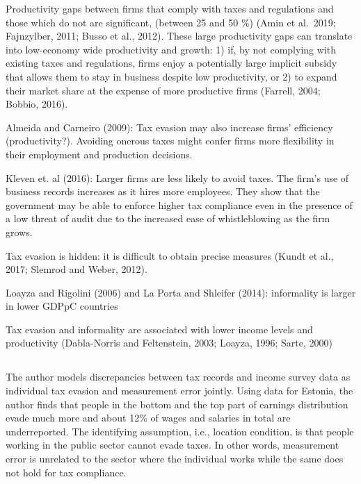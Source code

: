 \documentclass[
  12pt]{article}
\theoremstyle{definition}
\theoremstyle{remark}
\begin{document}
Productivity gaps between firms that comply with taxes and regulations
and those which do not are significant, (between 25 and 50 \%) (Amin et
al.~2019; Fajnzylber, 2011; Busso et al., 2012). These large
productivity gaps can translate into low-economy wide productivity and
growth: 1) if, by not complying with existing taxes and regulations,
firms enjoy a potentially large implicit subsidy that allows them to
stay in business despite low productivity, or 2) to expand their market
share at the expense of more productive firms (Farrell, 2004; Bobbio,
2016).

Almeida and Carneiro (2009): Tax evasion may also increase firms'
efficiency (productivity?). Avoiding onerous taxes might confer firms
more flexibility in their employment and production decisions.

Kleven et. al (2016): Larger firms are less likely to avoid taxes. The
firm's use of business records increases as it hires more employees.
They show that the government may be able to enforce higher tax
compliance even in the presence of a low threat of audit due to the
increased ease of whistleblowing as the firm grows.

Tax evasion is hidden: it is difficult to obtain precise measures (Kundt
et al., 2017; Slemrod and Weber, 2012).

Loayza and Rigolini (2006) and La Porta and Shleifer (2014): informality
is larger in lower GDPpC countries

Tax evasion and informality are associated with lower income levels and
productivity (Dabla-Norris and Feltenstein, 2003; Loayza, 1996; Sarte,
2000)

\subsection{\texorpdfstring{\citet{Paulus2015}}{@Paulus2015}}\label{paulus2015}

The author models discrepancies between tax records and income survey
data as individual tax evasion and measurement error jointly. Using data
for Estonia, the author finds that people in the bottom and the top part
of earnings distribution evade much more and about 12\% of wages and
salaries in total are underreported. The identifying assumption, i.e.,
location condition, is that people working in the public sector cannot
evade taxes. In other words, measurement error is unrelated to the
sector where the individual works while the same does not hold for tax
compliance.
\end{document}

